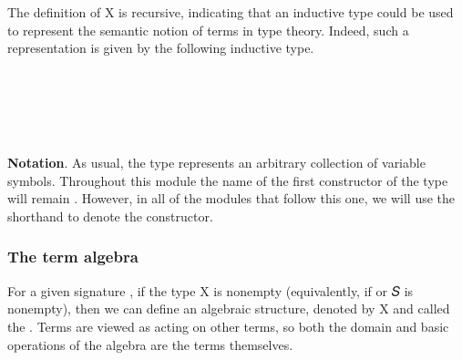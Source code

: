 The definition of  \ab X is recursive, indicating that an inductive type could be used to represent the semantic notion of terms in type theory. Indeed, such a representation is given by the following inductive type.
\ccpad
\begin{code}%
\>[0]\AgdaSpace{}%
\AgdaSpace{}%
\AgdaSymbol{\{}\AgdaSpace{}%
\AgdaSymbol{:}\AgdaSpace{}%
\AgdaSymbol{\}(}\AgdaSpace{}%
\AgdaSymbol{:}\AgdaSpace{}%
\AgdaSpace{}%
\AgdaSpace{}%
\AgdaSymbol{)}\AgdaSpace{}%
\AgdaSymbol{:}\AgdaSpace{}%
\AgdaSpace{}%
\AgdaSpace{}%
%
\>[45]\<%
\\
\>[0][@{}l@{\AgdaIndent{0}}]%
\>[2]\AgdaSpace{}%
\AgdaSymbol{:}\AgdaSpace{}%
\AgdaSpace{}%
\AgdaSpace{}%
\AgdaSpace{}%
\<%
\\
%
\>[2]\AgdaSpace{}%
\AgdaSymbol{:}\AgdaSpace{}%
\AgdaSymbol{(}\AgdaSpace{}%
\AgdaSymbol{:}\AgdaSpace{}%
\AgdaSpace{}%
\AgdaSpace{}%
\AgdaSymbol{)(}\AgdaSpace{}%
\AgdaSymbol{:}\AgdaSpace{}%
\AgdaSpace{}%
\AgdaSpace{}%
\AgdaSpace{}%
\AgdaSpace{}%
\AgdaSpace{}%
\AgdaSpace{}%
\AgdaSymbol{)}\AgdaSpace{}%
\AgdaSpace{}%
\AgdaSpace{}%
\<%
\\
%
\\[\AgdaEmptyExtraSkip]%
\>[0]\AgdaSpace{}%
\<%
\end{code}
\ccpad
\textbf{Notation}. As usual, the type  represents an arbitrary collection of variable symbols. Throughout this module the name of the first constructor of the  type will remain . However, in all of the modules that follow this one, we will use the shorthand  to denote the 
constructor.

\subsubsection{The term algebra}\label{the-term-algebra}

For a given signature , if the type  \ab X is nonempty (equivalently, if  or  \ab 𝑆  is nonempty), then we can define an algebraic structure, denoted by  \ab X and called the    . Terms are viewed as acting on other terms, so both the domain and basic operations of the algebra are the terms themselves.

